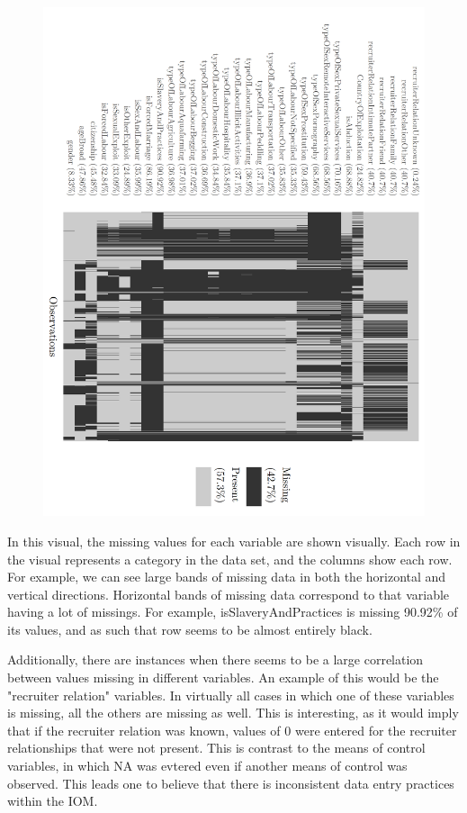 \documentclass{article} %
\begin{document}
	\FloatBarrier
	\begin{figure}[H]
		\hspace*{-2cm}
		\includegraphics[height = 1.4\textwidth, angle = 90]{NaniarVis1}
	\end{figure}
	\FloatBarrier
In this visual, the missing values for each variable are shown visually. Each row in the visual represents a category in the data set, and the columns show each row. For example, we can see large bands of missing data in both the horizontal and vertical directions. Horizontal bands of missing data correspond to that variable having a lot of missings. For example, isSlaveryAndPractices is missing 90.92\% of its values, and as such that row seems to be almost entirely black. 

Additionally, there are instances when there seems to be a large correlation between values missing in different variables. An example of this would be the "recruiter relation" variables. In virtually all cases in which one of these variables is missing, all the others are missing as well. This is interesting, as it would imply that if the recruiter relation was known, values of 0 were entered for the recruiter relationships that were not present. This is contrast to the means of control variables, in which NA was evtered even if another means of control was observed. This leads one to believe that there is inconsistent data entry practices within the IOM.
\end{document}
